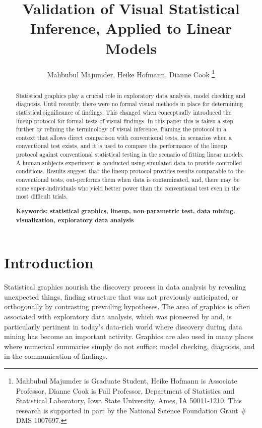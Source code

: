 \documentclass[12pt]{article}
\begin{document}
\title{Validation of Visual Statistical Inference, Applied to Linear Models}
\author{
{Mahbubul Majumder, Heike Hofmann, Dianne Cook}
\thanks{Mahbubul Majumder is Graduate Student, Heike Hofmann is Associate  Professor, Dianne Cook is Full Professor, Department of
Statistics and Statistical Laboratory, Iowa State University,
Ames, IA 50011-1210. This research is supported in part by the
National Science Foundation Grant \# DMS 1007697.}}
\date{\vspace{-.7in}}
\maketitle

\begin {abstract}  
Statistical graphics play a crucial role in exploratory data analysis, model checking and diagnosis. Until recently, there were no formal visual methods in place for determining statistical significance of findings. This changed when \citet{buja:2009} conceptually introduced the lineup protocol for formal tests of visual findings. In this paper this is taken a step further by refining the terminology of visual inference, framing the protocol in a context that allows direct comparison with conventional tests, in scenarios when a conventional test exists, and it is used to compare the performance of the lineup protocol against conventional statistical testing in the scenario of fitting linear models. A human subjects experiment is conducted using simulated data to provide controlled conditions. Results suggest that the lineup protocol provides results comparable to the conventional tests, out-performs them when data is contaminated, and, there may be some super-individuals who yield better power than the conventional test even in the most difficult trials.

{\bf Keywords: \sf statistical graphics, lineup, non-parametric test, data mining, visualization, exploratory data analysis} 
\end {abstract}


\section{Introduction} 


Statistical graphics nourish the discovery process in data analysis by revealing unexpected things,  finding structure that was not previously anticipated,  or orthogonally by contrasting prevailing hypotheses. The area of graphics is often associated with exploratory data analysis, which was pioneered by \cite{tukey:eda} and, is particularly pertinent in today's data-rich world where discovery during data mining has become an important activity. Graphics are also used in many places where numerical summaries simply do not suffice: model checking, diagnosis, and in the communication of findings. 
\end{document}
